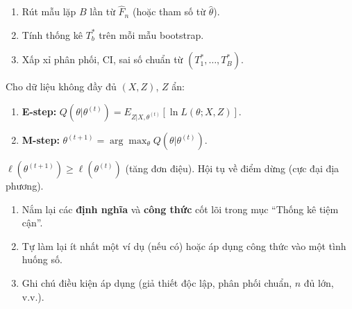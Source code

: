 \documentclass[12pt,a4paper]{article}
\begin{document}
\begin{phuongphap}[title={Bootstrap}]
  \begin{enumerate}
    \item Rút mẫu lặp $B$ lần từ $\hat{F}_n$ (hoặc tham số từ $\hat{\theta}$).
    \item Tính thống kê $T^*_b$ trên mỗi mẫu bootstrap.
    \item Xấp xỉ phân phối, CI, sai số chuẩn từ $(T^*_1, \ldots, T^*_B)$.
  \end{enumerate}
\end{phuongphap}

\begin{phuongphap}[title={Phương pháp EM (Expectation--Maximization)}]
  Cho dữ liệu không đầy đủ $(X, Z)$, $Z$ ẩn:
  \begin{enumerate}
    \item \textbf{E-step:} $Q(\theta|\theta^{(t)}) = E_{Z|X,\theta^{(t)}}[\ln L(\theta; X, Z)]$.
    \item \textbf{M-step:} $\theta^{(t+1)} = \arg\max_\theta Q(\theta|\theta^{(t)})$.
  \end{enumerate}
  $\ell(\theta^{(t+1)}) \ge \ell(\theta^{(t)})$ (tăng đơn điệu). Hội tụ về điểm dừng (cực đại địa phương).
\end{phuongphap}

\begin{tongket}[title={Tổng kết: Thống kê tiệm cận}]
\begin{enumerate}
  \item Nắm lại các \textbf{định nghĩa} và \textbf{công thức} cốt lõi trong mục ``Thống kê tiệm cận''.
  \item Tự làm lại ít nhất một ví dụ (nếu có) hoặc áp dụng công thức vào một tình huống số.
  \item Ghi chú điều kiện áp dụng (giả thiết độc lập, phân phối chuẩn, $n$ đủ lớn, v.v.).
\end{enumerate}
\end{tongket}
\end{document}
